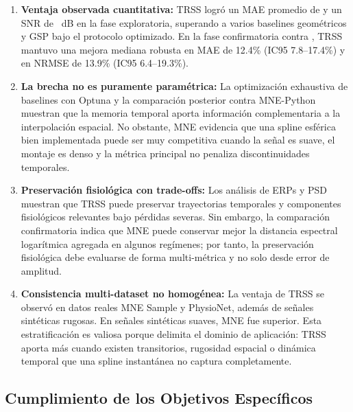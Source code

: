 \begin{enumerate}
    \item \textbf{Ventaja observada cuantitativa:} TRSS logró un MAE promedio de \ResTVMAE{} y un SNR de \ResTVSNR~dB en la fase exploratoria, superando a varios baselines geométricos y GSP bajo el protocolo optimizado. En la fase confirmatoria contra , TRSS mantuvo una mejora mediana robusta en MAE de 12.4\% (IC95 7.8--17.4\%) y en NRMSE de 13.9\% (IC95 6.4--19.3\%).

    \item \textbf{La brecha no es puramente paramétrica:} La optimización exhaustiva de baselines con Optuna y la comparación posterior contra MNE-Python muestran que la memoria temporal aporta información complementaria a la interpolación espacial. No obstante, MNE evidencia que una spline esférica bien implementada puede ser muy competitiva cuando la señal es suave, el montaje es denso y la métrica principal no penaliza discontinuidades temporales.

    \item \textbf{Preservación fisiológica con trade-offs:} Los análisis de ERPs y PSD muestran que TRSS puede preservar trayectorias temporales y componentes fisiológicos relevantes bajo pérdidas severas. Sin embargo, la comparación confirmatoria indica que MNE puede conservar mejor la distancia espectral logarítmica agregada en algunos regímenes; por tanto, la preservación fisiológica debe evaluarse de forma multi-métrica y no solo desde error de amplitud.

    \item \textbf{Consistencia multi-dataset no homogénea:} La ventaja de TRSS se observó en datos reales MNE Sample y PhysioNet, además de señales sintéticas rugosas. En señales sintéticas suaves, MNE fue superior. Esta estratificación es valiosa porque delimita el dominio de aplicación: TRSS aporta más cuando existen transitorios, rugosidad espacial o dinámica temporal que una spline instantánea no captura completamente.
\end{enumerate}

\subsection{Cumplimiento de los Objetivos Específicos}

